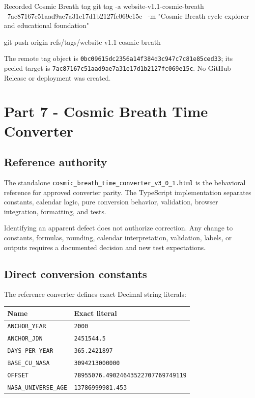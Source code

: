 \documentclass[11pt,letterpaper]{article}
\newcommand{\filepath}[1]{\nolinkurl{#1}}
\begin{document}
\begin{commandbox}{Recorded Cosmic Breath tag}
git tag -a website-v1.1-cosmic-breath \
  7ac87167c51aad9ae7a31e17d1b2127fc069e15c \
  -m "Cosmic Breath cycle explorer and educational foundation"

git push origin refs/tags/website-v1.1-cosmic-breath
\end{commandbox}

The remote tag object is
\filepath{0bc09615dc2356a14f384d3c947c7c81e85ced33}; its peeled target is
\filepath{7ac87167c51aad9ae7a31e17d1b2127fc069e15c}. No GitHub Release or
deployment was created.

\section{Part 7 - Cosmic Breath Time Converter}

\subsection{Reference authority}

The standalone
\filepath{cosmic\_breath\_time\_converter\_v3\_0\_1.html} is the behavioral
reference for approved converter parity. The TypeScript implementation
separates constants, calendar logic, pure conversion behavior, validation,
browser integration, formatting, and tests.

\begin{safetybox}
Identifying an apparent defect does not authorize correction. Any change to
constants, formulas, rounding, calendar interpretation, validation, labels, or
outputs requires a documented decision and new test expectations.
\end{safetybox}

\subsection{Direct conversion constants}

The reference converter defines exact Decimal string literals:

\begin{tabularx}{\textwidth}{L{1.75in}Y}
\toprule
\textbf{Name} & \textbf{Exact literal} \\
\midrule
\texttt{ANCHOR\_YEAR} & \texttt{2000} \\
\texttt{ANCHOR\_JDN} & \texttt{2451544.5} \\
\texttt{DAYS\_PER\_YEAR} & \texttt{365.2421897} \\
\texttt{BASE\_CU\_NASA} & \texttt{3094213000000} \\
\texttt{OFFSET} & \texttt{78955076.49024643522707769749119} \\
\texttt{NASA\_UNIVERSE\_AGE} & \texttt{13786999981.453} \\
\bottomrule
\end{tabularx}
\end{document}
